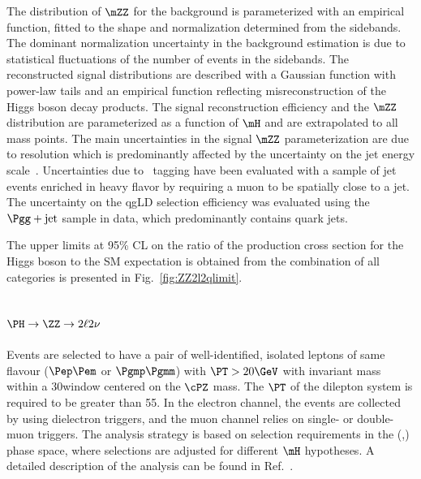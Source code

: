 The distribution of $\mZZ$ for the background is parameterized with an empirical function,
fitted to the shape and normalization determined from the sidebands.
The dominant normalization uncertainty in the background estimation
is due to statistical fluctuations of the number of events in the sidebands.
The reconstructed signal distributions are described with 
a Gaussian function with power-law tails
and an empirical function reflecting misreconstruction of the Higgs boson decay products.
The signal reconstruction efficiency and the $\mZZ$ distribution are parameterized as a function of $\mH$
and are extrapolated to all mass points. The main uncertainties in the signal $\mZZ$ parameterization
are due to resolution which is predominantly affected by the uncertainty on the jet energy scale~\cite{Chatrchyan:2011ds}.
Uncertainties due to \cPqb\ tagging have been evaluated with a sample of jet
events enriched in heavy flavor by requiring a muon to be spatially close to a jet.
The uncertainty on the qgLD selection efficiency was evaluated using the $\Pgg+\text{jet}$
sample in data, which predominantly contains quark jets.

The upper limits 
at 95\% CL on the ratio of the production
cross section for the Higgs boson to the SM expectation is
obtained from the combination of all categories 
is presented in Fig.~\ref{fig:ZZ2l2qlimit}.

\subsection{$\PH \to \ZZ \to 2\ell 2\nu$}

Events are selected to have a pair of well-identified, isolated leptons of same flavour ($\Pep\Pem$ or
$\Pgmp\Pgmm$) with $\PT > 20\GeV$ 
with invariant mass within a 30\GeV window centered on the $\cPZ$
mass. The $\PT$ of the dilepton system is required to be greater than
55\GeV.  In the electron channel, the events are collected by using
dielectron triggers, and
the muon channel relies on single- or double-muon triggers.
The analysis strategy is based on selection requirements in the (\MET,\MT)
phase space, where selections are adjusted for different $\mH$ hypotheses. 
A detailed description of the analysis can be found in Ref.~\cite{2l2qpaper}.

